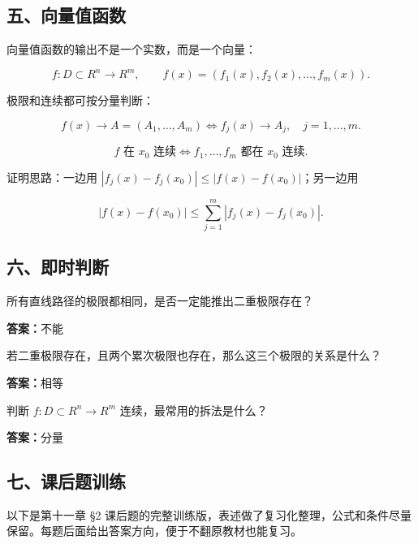 \subsection*{五、向量值函数}

向量值函数的输出不是一个实数，而是一个向量：

\[
      f:D\subset R^n\to R^m,\qquad
      f(x)=(f_1(x),f_2(x),\ldots,f_m(x)).
    \]

极限和连续都可按分量判断：

\[
      f(x)\to A=(A_1,\ldots,A_m)
      \Longleftrightarrow
      f_j(x)\to A_j,\quad j=1,\ldots,m.
    \]

\[
      f \text{ 在 } x_0 \text{ 连续}
      \Longleftrightarrow
      f_1,\ldots,f_m \text{ 都在 } x_0 \text{ 连续}.
    \]

证明思路：一边用 \(|f_j(x)-f_j(x_0)|\le |f(x)-f(x_0)|\)；另一边用

\[
      |f(x)-f(x_0)|
      \le\sum_{j=1}^{m}|f_j(x)-f_j(x_0)|.
    \]

\subsection*{六、即时判断}

\begin{quickcheck}
所有直线路径的极限都相同，是否一定能推出二重极限存在？

\tcblower
\textbf{答案：}不能
\end{quickcheck}

\begin{quickcheck}
若二重极限存在，且两个累次极限也存在，那么这三个极限的关系是什么？

\tcblower
\textbf{答案：}相等
\end{quickcheck}

\begin{quickcheck}
判断 \(f:D\subset R^n\to R^m\) 连续，最常用的拆法是什么？

\tcblower
\textbf{答案：}分量
\end{quickcheck}

\subsection*{七、课后题训练}

以下是第十一章 §2 课后题的完整训练版，表述做了复习化整理，公式和条件尽量保留。每题后面给出答案方向，便于不翻原教材也能复习。

